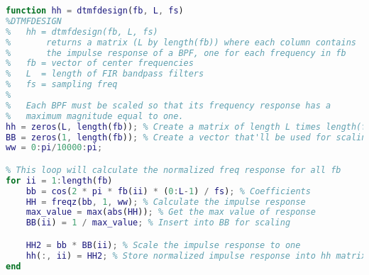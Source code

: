 \begin{lstlisting}[language=Matlab]
function hh = dtmfdesign(fb, L, fs)
%DTMFDESIGN
%   hh = dtmfdesign(fb, L, fs)
%       returns a matrix (L by length(fb)) where each column contains
%       the impulse response of a BPF, one for each frequency in fb
%   fb = vector of center frequencies
%   L  = length of FIR bandpass filters
%   fs = sampling freq
%
%   Each BPF must be scaled so that its frequency response has a
%   maximum magnitude equal to one.
hh = zeros(L, length(fb)); % Create a matrix of length L times length(fb)
BB = zeros(1, length(fb)); % Create a vector that'll be used for scaling
ww = 0:pi/10000:pi;

% This loop will calculate the normalized freq response for all fb
for ii = 1:length(fb)
    bb = cos(2 * pi * fb(ii) * (0:L-1) / fs); % Coefficients
    HH = freqz(bb, 1, ww); % Calculate the impulse response
    max_value = max(abs(HH)); % Get the max value of response
    BB(ii) = 1 / max_value; % Insert into BB for scaling

    HH2 = bb * BB(ii); % Scale the impulse response to one
    hh(:, ii) = HH2; % Store normalized impulse response into hh matrix
end
\end{lstlisting}